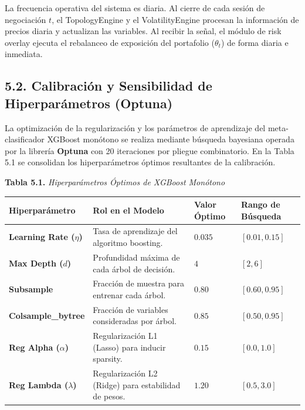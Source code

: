 \documentclass[
  12pt,
]{article}
\newcounter{none} %
\begin{document}
La frecuencia operativa del sistema es diaria. Al cierre de cada sesión
de negociación \(t\), el TopologyEngine y el VolatilityEngine procesan
la información de precios diaria y actualizan las variables. Al recibir
la señal, el módulo de risk overlay ejecuta el rebalanceo de exposición
del portafolio (\(\theta_t\)) de forma diaria e inmediata.

\subsection{5.2. Calibración y Sensibilidad de Hiperparámetros
(Optuna)}\label{calibraciuxf3n-y-sensibilidad-de-hiperparuxe1metros-optuna}

La optimización de la regularización y los parámetros de aprendizaje del
meta-clasificador XGBoost monótono se realiza mediante búsqueda
bayesiana operada por la librería \textbf{Optuna} con 20 iteraciones por
pliegue combinatorio. En la Tabla 5.1 se consolidan los hiperparámetros
óptimos resultantes de la calibración.

\textbf{Tabla 5.1.} \emph{Hiperparámetros Óptimos de XGBoost Monótono}

{\def\LTcaptype{none} %
\begin{longtable}[]{@{}
  >{\raggedright\arraybackslash}p{}
  >{\raggedright\arraybackslash}p{}
  >{\centering\arraybackslash}p{}
  >{\centering\arraybackslash}p{}@{}}
\toprule\noalign{}
\begin{minipage}[b]{\linewidth}\raggedright
Hiperparámetro
\end{minipage} & \begin{minipage}[b]{\linewidth}\raggedright
Rol en el Modelo
\end{minipage} & \begin{minipage}[b]{\linewidth}\centering
Valor Óptimo
\end{minipage} & \begin{minipage}[b]{\linewidth}\centering
Rango de Búsqueda
\end{minipage} \\
\midrule\noalign{}
\endhead
\bottomrule\noalign{}
\endlastfoot
\textbf{Learning Rate (\(\eta\))} & Tasa de aprendizaje del algoritmo
boosting. & \(0.035\) & \([0.01, 0.15]\) \\
\textbf{Max Depth (\(d\))} & Profundidad máxima de cada árbol de
decisión. & \(4\) & \([2, 6]\) \\
\textbf{Subsample} & Fracción de muestra para entrenar cada árbol. &
\(0.80\) & \([0.60, 0.95]\) \\
\textbf{Colsample\_bytree} & Fracción de variables consideradas por
árbol. & \(0.85\) & \([0.50, 0.95]\) \\
\textbf{Reg Alpha (\(\alpha\))} & Regularización L1 (Lasso) para inducir
sparsity. & \(0.15\) & \([0.0, 1.0]\) \\
\textbf{Reg Lambda (\(\lambda\))} & Regularización L2 (Ridge) para
estabilidad de pesos. & \(1.20\) & \([0.5, 3.0]\) \\
\end{longtable}
}
\end{document}
